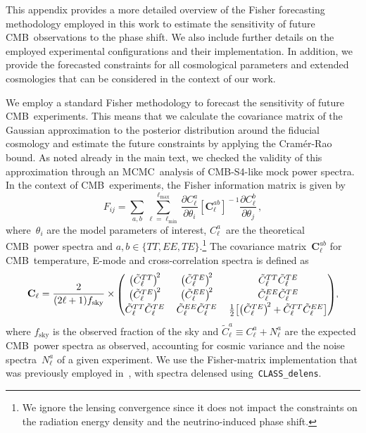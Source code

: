 \begin{subappendices}
This appendix provides a more detailed overview of the Fisher forecasting methodology employed in this work to estimate the sensitivity of future CMB~observations to the phase shift. We also include further details on the employed experimental configurations and their implementation. In addition, we provide the forecasted constraints for all cosmological parameters and extended cosmologies that can be considered in the context of our work.\medskip

We employ a standard Fisher methodology to forecast the sensitivity of future CMB~experiments. This means that we calculate the covariance matrix of the Gaussian approximation to the posterior distribution around the fiducial cosmology and estimate the future constraints by applying the Cramér-Rao bound. As noted already in the main text, we checked the validity of this approximation through an MCMC~analysis of \mbox{CMB-S4}-like mock power spectra. In the context of CMB~experiments, the Fisher information matrix is given by
\begin{equation}
	F_{ij} = \sum_{a,b}\sum^{\ell_\mathrm{max}}_{\ell=\ell_\mathrm{min}}\frac{\partial C^a_\ell}{\partial \theta_i} \left[\mathbf{C}^{a b}_\ell\right]^{\!-1} \frac{\partial C^b_\ell}{\partial \theta_j}\, ,	\label{ch12-eq:Fisher}
\end{equation}
where~$\theta_i$ are the model parameters of interest, $C_\ell^a$~are the theoretical CMB~power spectra and $a, b \in \{TT, EE, TE\}$.\footnote{We ignore the lensing convergence since it does not impact the constraints on the radiation energy density and the neutrino-induced phase shift.}
The covariance matrix~$\mathbf{C}^{ab}_\ell$ for CMB~temperature, E-mode and cross-correlation spectra is defined as
\begin{equation}
	\mathbf{C}_{\ell} = \frac{2}{(2 \ell+1) f_\mathrm{sky}} \times \,
	\begingroup
	\scriptstyle \renewcommand*{\arraystretch}{1.2} \setlength{\arraycolsep}{6pt}
	\begin{pmatrix}
		\bigl(\tilde{C}_\ell^{TT}\bigr)^{\!2}	& \bigl(\tilde{C}_\ell^{TE}\bigr)^{\!2}		& \tilde{C}_\ell^{TT} \tilde{C}_\ell^{TE}																	\\
		\bigl(\tilde{C}_\ell^{TE}\bigr)^{\!2}	& \bigl(\tilde{C}_\ell^{EE}\bigr)^{\!2}		& \tilde{C}_\ell^{EE} \tilde{C}_\ell^{TE}																	\\
		\tilde{C}_\ell^{TT} \tilde{C}_\ell^{TE}	& \tilde{C}_\ell^{EE} \tilde{C}_\ell^{TE}	& \frac{1}{2} \bigl[\bigl(\tilde{C}_\ell^{TE}\bigr)^{\!2} + \tilde{C}_\ell^{TT} \tilde{C}_\ell^{EE}\bigr]
	\end{pmatrix}
	\endgroup ,
	\label{ch12-eq:Fisher_covariance}
\end{equation}
where $f_\mathrm{sky}$ is the observed fraction of the sky and $\tilde{C}_\ell^a \equiv C_{\ell}^a + N_\ell^a$ are the expected CMB~power spectra as observed, accounting for cosmic variance and the noise spectra~$N_\ell^a$ of a given experiment. We use the Fisher-matrix implementation that was previously employed in~\cite{Baumann:2017gkg, Beutler:2019ojk}, with spectra delensed using~\texttt{CLASS\_delens}.\medskip


\end{subappendices}
